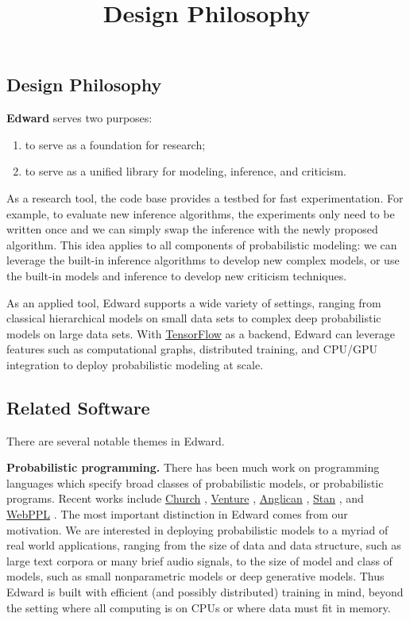 \title{Design Philosophy}

\subsection{Design Philosophy}

\textbf{Edward} serves two purposes:

\begin{enumerate}
\def\labelenumi{\arabic{enumi}.}
\item
  to serve as a foundation for research;
\item
  to serve as a unified library for modeling, inference, and criticism.
\end{enumerate}

As a research tool, the code base provides a testbed for fast
experimentation. For example, to evaluate new inference algorithms,
the experiments only need to be written once and we can simply swap
the inference with the newly proposed algorithm. This idea applies to
all components of probabilistic modeling: we can leverage the built-in
inference algorithms to develop new complex models, or use the
built-in models and inference to develop new criticism techniques.

As an applied tool, Edward supports a wide variety of settings,
ranging from classical hierarchical models on small data sets to
complex deep probabilistic models on large data sets. With
\href{https://www.tensorflow.org}{TensorFlow} as a backend, Edward can
leverage features such as computational graphs, distributed training,
and CPU/GPU integration to deploy probabilistic modeling at scale.

\subsection{Related Software}\label{related-software}

There are several notable themes in Edward.

\textbf{Probabilistic programming.}
There has been much work on programming languages which specify
broad classes of probabilistic models, or probabilistic
programs. Recent works include
\href{http://projects.csail.mit.edu/church/wiki/Church}{Church}
\citep{goodman2012church},
\href{http://probcomp.csail.mit.edu/venture/}{Venture}
\citep{mansinghka2014venture},
\href{http://www.robots.ox.ac.uk/~fwood/anglican/literature/index.html}{Anglican}
\citep{wood2014new},
\href{http://mc-stan.org}{Stan}
\citep{carpenter2016stan}, and
\href{http://webppl.org}{WebPPL}
\citep{goodman2014design}.
The most important distinction in Edward comes from our motivation.
We are interested in deploying probabilistic models to a myriad of
real world applications, ranging from the size of data and
data structure, such as large text corpora or many brief audio signals,
to the size of model and class of models, such as small nonparametric
models or deep generative models.
Thus Edward is built with efficient (and possibly distributed)
training in mind, beyond the setting where all computing is on CPUs
or where data must fit in memory.

